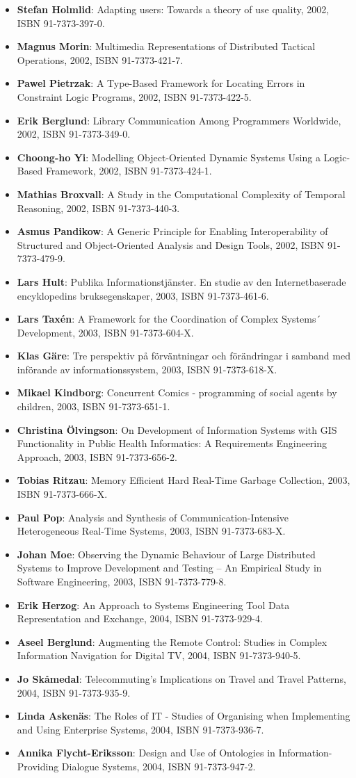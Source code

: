 \documentclass[a4paper,showtrims,twocolumn]{memoir}
\newenvironment{theses}
  {
    \begin{itemize}
      \setlength{\itemsep}{0.2em}
      \setlength{\parskip}{0em}
      \setlength{\parsep}{0em}
  }
  {
    \end{itemize}
  }
\newcommand{\thesis}[5]{\item[No. #1] \textbf{#2}: #3, #4, ISBN #5.}
\begin{document}
\begin{theses}
    \thesis{765}{Stefan Holmlid}{Adapting users: Towards a theory of use quality}{2002}{91-7373-397-0}
    \thesis{771}{Magnus Morin}{Multimedia Representations of Distributed Tactical Operations}{2002}{91-7373-421-7}
    \thesis{772}{Pawel Pietrzak}{A Type-Based Framework for Locating Errors in Constraint Logic Programs}{2002}{91-7373-422-5}
    \thesis{758}{Erik Berglund}{Library Communication Among Programmers Worldwide}{2002}{91-7373-349-0}
    \thesis{774}{Choong-ho Yi}{Modelling Object-Oriented Dynamic Systems Using a Logic-Based Framework}{2002}{91-7373-424-1}
    \thesis{779}{Mathias Broxvall}{A Study in the Computational Complexity of Temporal Reasoning}{2002}{91-7373-440-3}
    \thesis{793}{Asmus Pandikow}{A Generic Principle for Enabling Interoperability of Structured and Object-Oriented Analysis and Design Tools}{2002}{91-7373-479-9}
    \thesis{785}{Lars Hult}{Publika Informationstjänster. En studie av den Internetbaserade encyklopedins bruksegenskaper}{2003}{91-7373-461-6}
    \thesis{800}{Lars Taxén}{A Framework for the Coordination of Complex Systems´ Development}{2003}{91-7373-604-X}
    \thesis{808}{Klas Gäre}{Tre perspektiv på förväntningar och förändringar i samband med införande av informationssystem}{2003}{91-7373-618-X}
    \thesis{821}{Mikael Kindborg}{Concurrent Comics - programming of social agents by children}{2003}{91-7373-651-1}
    \thesis{823}{Christina Ölvingson}{On Development of Information Systems with GIS Functionality in Public Health Informatics: A Requirements Engineering Approach}{2003}{91-7373-656-2}
    \thesis{828}{Tobias Ritzau}{Memory Efficient Hard Real-Time Garbage Collection}{2003}{91-7373-666-X}
    \thesis{833}{Paul Pop}{Analysis and Synthesis of Communication-Intensive Heterogeneous Real-Time Systems}{2003}{91-7373-683-X}
    \thesis{852}{Johan Moe}{Observing the Dynamic Behaviour of Large Distributed Systems to Improve Development and Testing – An Empirical Study in Software Engineering}{2003}{91-7373-779-8}
    \thesis{867}{Erik Herzog}{An Approach to Systems Engineering Tool Data Representation and Exchange}{2004}{91-7373-929-4}
    \thesis{872}{Aseel Berglund}{Augmenting the Remote Control: Studies in Complex Information Navigation for Digital TV}{2004}{91-7373-940-5}
    \thesis{869}{Jo Skåmedal}{Telecommuting’s Implications on Travel and Travel Patterns}{2004}{91-7373-935-9}
    \thesis{870}{Linda Askenäs}{The Roles of IT - Studies of Organising when Implementing and Using Enterprise Systems}{2004}{91-7373-936-7}
    \thesis{874}{Annika Flycht-Eriksson}{Design and Use of Ontologies in Information-Providing Dialogue Systems}{2004}{91-7373-947-2}

\end{theses}
\end{document}

